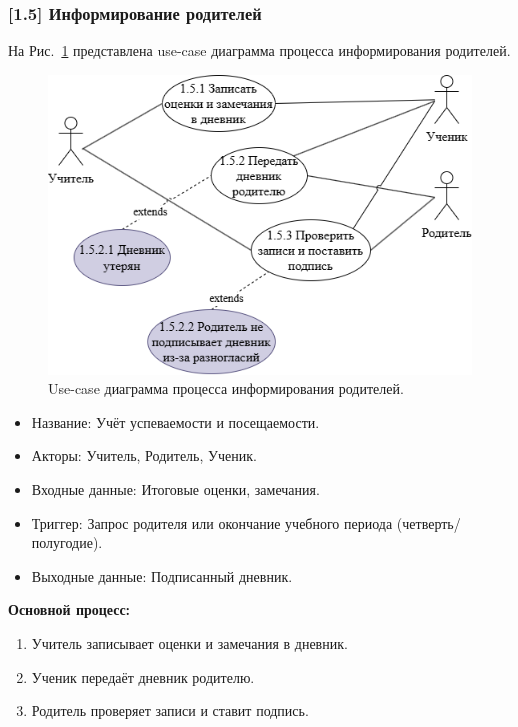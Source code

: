 \documentclass[a4paper, final]{article}
\begin{document}
\subsubsection{[1.5] Информирование родителей}
На Рис.~\ref{img:use_case25} представлена use-case диаграмма процесса информирования родителей.

\begin{figure}[H]
  \centering
  \includegraphics[width=\linewidth]{use_case25.png}
  \caption{Use-case диаграмма процесса информирования родителей.}
  \label{img:use_case25}
\end{figure}

\begin{itemize}
  \item Название: Учёт успеваемости и посещаемости.
  \item Акторы: Учитель, Родитель, Ученик.
  \item Входные данные: Итоговые оценки, замечания.
  \item Триггер: Запрос родителя или окончание учебного периода (четверть/полугодие).
  \item Выходные данные: Подписанный дневник.
\end{itemize}

\textbf{Основной процесс:}
\begin{enumerate}
  \item[1.5.1] Учитель записывает оценки и замечания в дневник.
  \item[1.5.2] Ученик передаёт дневник родителю.
  \item[1.5.3] Родитель проверяет записи и ставит подпись.
\end{enumerate}
\end{document}
